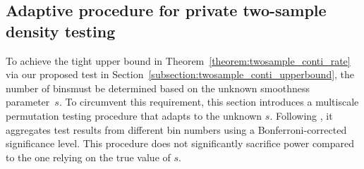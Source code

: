 \documentclass[twoside,11pt]{article}
\newcommand{\smoothness}{s}
\begin{document}
\subsection{Adaptive procedure for private two-sample density testing }\label{subsection:adaptive}%
To achieve the tight upper bound in Theorem~\ref{theorem:twosample_conti_rate} via our proposed test in Section~\ref{subsection:twosample_conti_upperbound}, the number of binsmust be determined based on the unknown smoothness parameter~$\smoothness$. To circumvent this requirement, this section introduces a multiscale permutation testing procedure that  adapts to the unknown $\smoothness$. 
Following \citet{Ingster2000AdaptiveTests}, it aggregates test results from different bin numbers using a Bonferroni-corrected significance level. This procedure does not significantly sacrifice power compared to the one relying on the true value of $s$.
\end{document}
